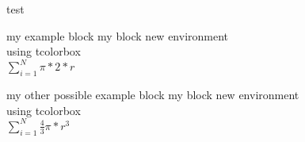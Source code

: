 \documentclass{beamer}
\begin{document}
\begin{frame}{test}

\begin{myblock}{my example block}
    my block new environment\\
    using tcolorbox\\
    $\sum^N_{i=1}\pi * 2 * r$
\end{myblock}
\begin{myblock2}{my other possible example block}
    my block new environment\\
    using tcolorbox\\
    $\sum^N_{i=1}\frac{4}{3}\pi * r^3$
\end{myblock2}

\end{frame}




\end{document}
